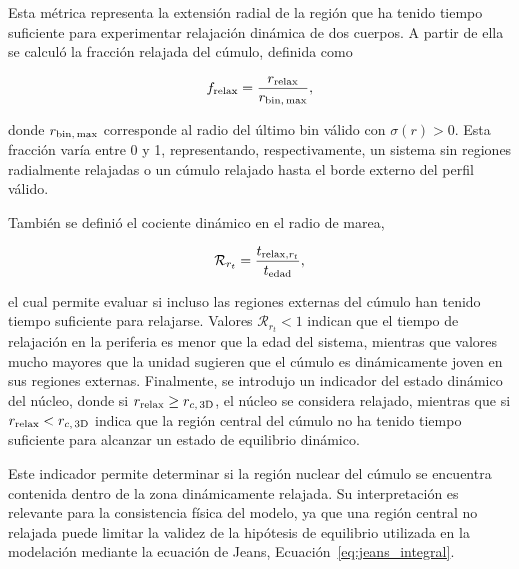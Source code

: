         Esta métrica representa la extensión radial de la región que ha tenido 
        tiempo suficiente para experimentar relajación dinámica de dos cuerpos. 
        A partir de ella se calculó la fracción relajada del cúmulo, definida 
        como

        \begin{equation*}
            f_{\rm relax} =
            \frac{r_{\rm relax}}{r_{{\rm bin},\, \max}},
        \end{equation*}

        donde $r_{{\rm bin},\, \max}$ corresponde al radio del último bin válido 
        con $\sigma(r)>0$. Esta fracción varía entre 0 y 1, representando, 
        respectivamente, un sistema sin regiones radialmente relajadas o un 
        cúmulo relajado hasta el borde externo del perfil válido.

        También se definió el cociente dinámico en el radio de marea,

        \begin{equation*}
            \mathcal{R}_{r_t} =
            \frac{t_{{\rm relax},r_t}}{t_{\rm edad}},
        \end{equation*}

        el cual permite evaluar si incluso las regiones externas del cúmulo han 
        tenido tiempo suficiente para relajarse. Valores 
        $\mathcal{R}_{r_t}<1$ indican que el tiempo de relajación en la periferia 
        es menor que la edad del sistema, mientras que valores mucho mayores que 
        la unidad sugieren que el cúmulo es dinámicamente joven en sus regiones 
        externas. Finalmente, se introdujo un indicador del estado 
        dinámico del núcleo, donde si $r_{\rm relax} \geq r_{c,\, \rm 3D}$, el 
        núcleo se considera relajado, mientras que si $r_{\rm relax} < 
        r_{c,\, \rm 3D}$ indica que la región central del cúmulo no ha tenido 
        tiempo suficiente para alcanzar un estado de equilibrio dinámico.

        Este indicador permite determinar si la región nuclear del cúmulo se 
        encuentra contenida dentro de la zona dinámicamente relajada. Su 
        interpretación es relevante para la consistencia física del modelo, ya 
        que una región central no relajada puede limitar la validez de la 
        hipótesis de equilibrio utilizada en la modelación mediante la ecuación 
        de Jeans, Ecuación~\eqref{eq:jeans_integral}.

